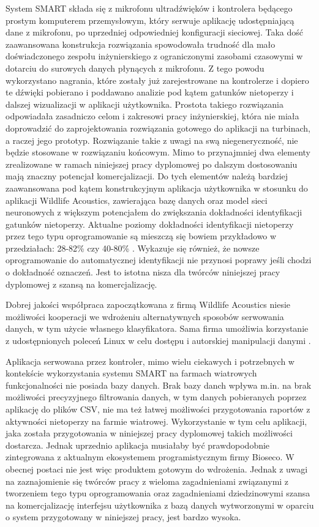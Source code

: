 \documentclass{sprz}
\begin{document}
System SMART składa się z mikrofonu ultradźwięków i kontrolera będącego prostym komputerem przemysłowym, który serwuje aplikację udostępniającą dane z mikrofonu, po uprzedniej odpowiedniej konfiguracji sieciowej. Taka dość zaawansowana konstrukcja rozwiązania spowodowała trudność dla mało doświadczonego zespołu inżynierskiego z ograniczonymi zasobami czasowymi w dotarciu do surowych danych płynących z mikrofonu. Z tego powodu wykorzystano nagrania, które zostały już zarejestrowane na kontrolerze i dopiero te dźwięki pobierano i poddawano analizie pod kątem gatunków nietoperzy i dalszej wizualizacji w aplikacji użytkownika. Prostota takiego rozwiązania odpowiadała zasadniczo celom i zakresowi pracy inżynierskiej, która nie miała doprowadzić do zaprojektowania rozwiązania gotowego do aplikacji na turbinach, a raczej jego prototyp. Rozwiązanie takie z uwagi na swą niegeneryczność, nie będzie stosowane w rozwiązaniu końcowym. Mimo to przynajmniej dwa elementy zrealizowane w ramach niniejszej pracy dyplomowej po dalszym dostosowaniu mają znaczny potencjał komercjalizacji. Do tych elementów należą bardziej zaawansowana pod kątem konstrukcyjnym aplikacja użytkownika w stosunku do aplikacji Wildlife Acoustics, zawierająca bazę danych oraz model sieci neuronowych z większym potencjałem do zwiększania dokładności identyfikacji gatunków nietoperzy. Aktualne poziomy dokładności identyfikacji nietoperzy przez tego typu oprogramowanie są mieszczą się bowiem przykładowo w przedziałach: 28-82\% \cite{kaleidoscope-accuracy} czy 40-80\% \cite{kaleidoscope-bias}. Wykazuje się również, że nowsze oprogramowanie do automatycznej identyfikacji nie przynosi poprawy jeśli chodzi o dokładność oznaczeń. Jest to istotna nisza dla twórców niniejszej pracy dyplomowej z szansą na komercjalizację.

Dobrej jakości współpraca zapoczątkowana z firmą Wildlife Acoustics niesie możliwości kooperacji we wdrożeniu alternatywnych sposobów serwowania danych, w tym użycie własnego klasyfikatora. Sama firma umożliwia korzystanie z udostępnionych poleceń Linux w celu dostępu i autorskiej manipulacji danymi \cite{smart-linux-guide}.

Aplikacja serwowana przez kontroler, mimo wielu ciekawych i potrzebnych w kontekście wykorzystania systemu SMART na farmach wiatrowych funkcjonalności nie posiada bazy danych. Brak bazy danch wpływa m.in. na brak możliwości precyzyjnego filtrowania danych, w tym danych pobieranych poprzez aplikację do plików CSV, nie ma też łatwej możliwości przygotowania raportów z aktywności nietoperzy na farmie wiatrowej. Wykorzystanie w tym celu aplikacji, jaka została przygotowania w niniejszej pracy dyplomowej takich możliwości dostarcza. Jednak uprzednio aplikacja musiałaby być prawdopodobnie zintegrowana z aktualnym ekosystemem programistycznym firmy Bioseco. W obecnej postaci nie jest więc produktem gotowym do wdrożenia. Jednak z uwagi na zaznajomienie się twórców pracy z wieloma zagadnieniami związanymi z tworzeniem tego typu oprogramowania oraz zagadnieniami dziedzinowymi szansa na komercjalizację interfejsu użytkownika z bazą danych wytworzonymi w oparciu o system przygotowany w niniejszej pracy, jest bardzo wysoka. 
\end{document}

